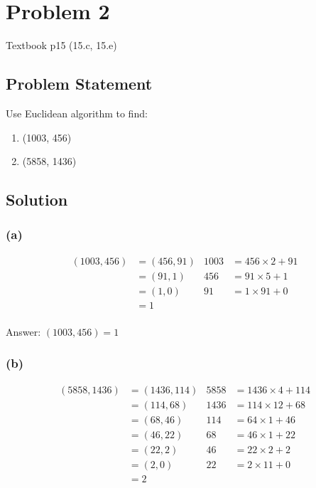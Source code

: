 \documentclass{article}
\begin{document}
\section*{Problem 2}

Textbook p15 (15.c, 15.e)

\subsection*{Problem Statement}

Use Euclidean algorithm to find:
\begin{enumerate}[label=(\alph*)]
	\item (1003, 456)
	\item (5858, 1436)
\end{enumerate}

\subsection*{Solution}

\subsubsection*{(a)}

\begin{align*}
	(1003, 456) & = (456, 91) & 1003 & = 456 \times 2 + 91 \\
	            & = (91, 1)   & 456  & = 91 \times 5 + 1   \\
	            & = (1, 0)    & 91   & = 1 \times 91 + 0   \\
	            & = 1                                      \\
\end{align*}

Answer: $(1003, 456) = 1$

\subsubsection*{(b)}

\begin{align*}
	(5858, 1436) & = (1436, 114) & 5858 & = 1436 \times 4 + 114 \\
	             & = (114, 68)   & 1436 & = 114 \times 12 + 68  \\
	             & = (68, 46)    & 114  & = 64 \times 1 + 46    \\
	             & = (46, 22)    & 68   & = 46 \times 1 + 22    \\
	             & = (22, 2)     & 46   & = 22\times 2 + 2      \\
	             & = (2, 0)      & 22   & = 2 \times 11 + 0     \\
	             & = 2
\end{align*}
\end{document}
